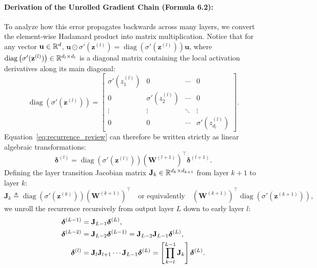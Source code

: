 \paragraph{Derivation of the Unrolled Gradient Chain (Formula 6.2):}
To analyze how this error propagates backwards across many layers, we convert the element-wise Hadamard product into matrix multiplication. Notice that for any vector $\mathbf{u} \in \mathbb{R}^d$, $\mathbf{u} \odot \sigma'(\mathbf{z}^{(l)}) = \operatorname{diag}\left(\sigma'(\mathbf{z}^{(l)})\right) \mathbf{u}$, where $\operatorname{diag}\left(\sigma'(\mathbf{z}^{(l)})\right) \in \mathbb{R}^{d_l \times d_l}$ is a diagonal matrix containing the local activation derivatives along its main diagonal:
\begin{equation}
\operatorname{diag}\left(\sigma'(\mathbf{z}^{(l)})\right) = \begin{bmatrix}
\sigma'(z_1^{(l)}) & 0 & \cdots & 0 \\
0 & \sigma'(z_2^{(l)}) & \cdots & 0 \\
\vdots & \vdots & \ddots & \vdots \\
0 & 0 & \cdots & \sigma'(z_{d_l}^{(l)})
\end{bmatrix}.
\end{equation}
Equation~\eqref{eq:recurrence_review} can therefore be written strictly as linear algebraic transformations:
\begin{equation}
\boldsymbol{\delta}^{(l)} = \operatorname{diag}\left(\sigma'(\mathbf{z}^{(l)})\right) (\mathbf{W}^{(l+1)})^\top \boldsymbol{\delta}^{(l+1)}.
\end{equation}
Defining the layer transition Jacobian matrix $\mathbf{J}_k \in \mathbb{R}^{d_k \times d_{k+1}}$ from layer $k+1$ to layer $k$:
\begin{equation}
\mathbf{J}_k \triangleq \operatorname{diag}\left(\sigma'(\mathbf{z}^{(k)})\right) (\mathbf{W}^{(k+1)})^\top \quad \text{or equivalently} \quad (\mathbf{W}^{(k+1)})^\top \operatorname{diag}\left(\sigma'(\mathbf{z}^{(k+1)})\right),
\end{equation}
we unroll the recurrence recursively from output layer $L$ down to early layer $l$:
\begin{align}
\boldsymbol{\delta}^{(L-1)} &= \mathbf{J}_{L-1} \boldsymbol{\delta}^{(L)}, \notag \\
\boldsymbol{\delta}^{(L-2)} &= \mathbf{J}_{L-2} \boldsymbol{\delta}^{(L-1)} = \mathbf{J}_{L-2} \mathbf{J}_{L-1} \boldsymbol{\delta}^{(L)}, \notag \\
\boldsymbol{\delta}^{(l)} &= \mathbf{J}_l \mathbf{J}_{l+1} \cdots \mathbf{J}_{L-1} \boldsymbol{\delta}^{(L)} = \left[ \prod_{k=l}^{L-1} \mathbf{J}_k \right] \boldsymbol{\delta}^{(L)}.
\end{align}
